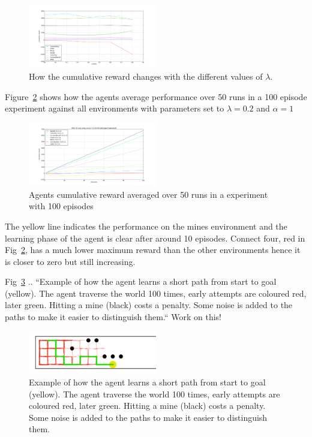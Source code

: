 \begin{figure}[h]
    \centering
    \includegraphics[width=0.5\textwidth]{../data/lambdasweepplot.png}
    \caption{How the cumulative reward changes with the different values of $\lambda$.}
    \label{fig:awesome_image}
\end{figure}
Figure~\ref{fig:cumreward} shows how the agents average performance over 50 runs in a 100 episode experiment against all environments with parameters set to $\lambda = 0.2$ and $\alpha = 1$

\begin{figure}[h!]
    \centering
    \includegraphics[width=0.5\textwidth]{../data/100episodes_50runs.png}
    \caption{Agents cumulative reward averaged over 50 runs in a experiment with 100 episodes}
    \label{fig:cumreward}
\end{figure} 
The yellow line indicates the performance on the mines environment and the learning phase of the agent is clear after around 10 episodes. Connect four, red in Fig~\ref{fig:cumreward}, has a much lower maximum reward than the other environments hence it is closer to zero but still increasing.

Fig~\ref{fig:mineslearning} .. ``Example of how the agent learns a short path from start to goal (yellow). The agent traverse the world 100 times, early attempts are coloured red, later green. Hitting a mine (black) costs a penalty. Some noise is added to the paths to make it easier to distinguish them.``
Work on this!

\begin{figure}[h]
    \centering
    \includegraphics[width=0.5\textwidth]{../data/minPlot.png}
    \caption{Example of how the agent learns a short path from start to goal (yellow). The agent traverse the world 100 times, early attempts are coloured red, later green. Hitting a mine (black) costs a penalty. Some noise is added to the paths to make it easier to distinguish them.}
    \label{fig:mineslearning}
\end{figure} 


